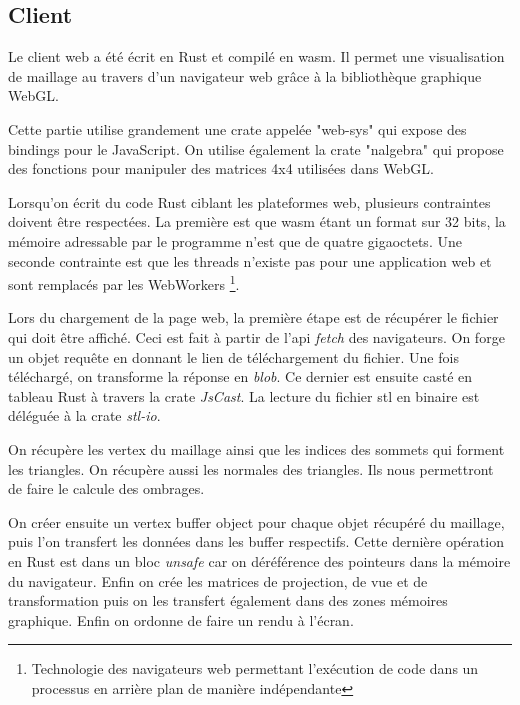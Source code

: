 \subsection{Client}

Le client web a été écrit en Rust et compilé en \gls{wasm}.
Il permet une visualisation de maillage au travers d'un navigateur web grâce à
la bibliothèque graphique WebGL.

Cette partie utilise grandement une crate appelée "web-sys" qui expose des bindings pour le JavaScript.
On utilise également la crate "nalgebra" qui propose des fonctions pour manipuler des matrices 4x4 utilisées dans WebGL.

Lorsqu'on écrit du code Rust ciblant les plateformes web, plusieurs contraintes
doivent être respectées. La première est que \gls{wasm} étant un format sur 32
bits, la mémoire adressable par le programme n'est que de quatre gigaoctets. Une
seconde contrainte est que les threads n'existe pas pour une application web
et sont remplacés par les WebWorkers
\footnote{Technologie des navigateurs web permettant l'exécution de
code dans un processus en arrière plan de manière indépendante}.

Lors du chargement de la page web, la première étape est de récupérer le fichier
qui doit être affiché.
Ceci est fait à partir de l'\gls{api} \textit{fetch} des
navigateurs. On forge un objet requête en donnant le lien de téléchargement du
fichier. Une fois téléchargé, on transforme la réponse en \textit{blob}.
Ce dernier est ensuite casté en tableau Rust à travers la crate \textit{JsCast}.
La lecture du fichier \gls{stl} en binaire est déléguée à la crate \textit{stl-io}.

On récupère les vertex du maillage ainsi que les indices des sommets qui forment les
triangles. On récupère aussi les normales des triangles. Ils nous permettront de
faire le calcule des ombrages.

On créer ensuite un vertex buffer object pour chaque objet récupéré du
maillage, puis l'on transfert les données dans les buffer respectifs.
Cette dernière opération en Rust est dans un bloc \textit{unsafe} car on déréférence des
pointeurs dans la mémoire du navigateur.
Enfin on crée les matrices de projection, de vue et de transformation 
puis on les transfert également dans des zones mémoires graphique.
Enfin on ordonne de faire un rendu à l'écran.


